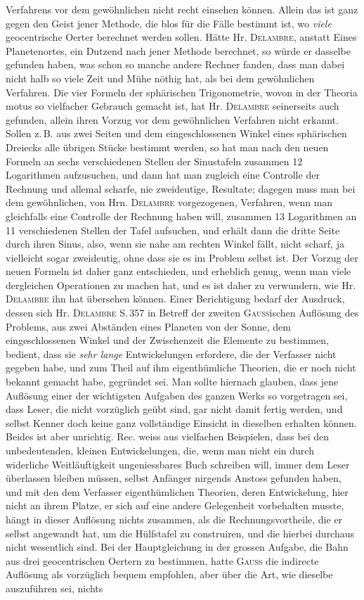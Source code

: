 \noindent Verfahrens vor dem gewöhnlichen nicht recht einsehen können. Allein das ist ganz gegen den Geist jener Methode, die blos für die Fälle bestimmt ist, wo \emph{viele} geocentrische Oerter berechnet werden sollen. Hätte Hr. \textsc{Delambre}, anstatt Eines Planetenortes, ein Dutzend nach jener Methode berechnet, so würde er dasselbe gefunden haben, was schon so manche andere Rechner fanden, dass man dabei nicht halb so viele Zeit und Mühe nöthig hat, als bei dem gewöhnlichen Verfahren. Die vier Formeln der sphärischen Trigonometrie, wovon in der Theoria motus so vielfacher Gebrauch gemacht ist, hat Hr. \textsc{Delambre} seinerseits auch gefunden, allein ihren Vorzug vor dem gewöhnlichen Verfahren nicht erkannt. Sollen z.\,B. aus zwei Seiten und dem eingeschlossenen Winkel eines sphärischen Dreiecks alle übrigen Stücke bestimmt werden, so hat man nach den neuen Formeln an sechs verschiedenen Stellen der Sinustafeln zusammen 12 Logarithmen aufzusuchen, und dann hat man zugleich eine Controlle der Rechnung und allemal scharfe, nie zweideutige, Resultate; dagegen muss man bei dem gewöhnlichen, von Hrn. \textsc{Delambre} vorgezogenen, Verfahren, wenn man gleichfalls eine Controlle der Rechnung haben will, zusammen 13 Logarithmen an 11 verschiedenen Stellen der Tafel aufsuchen, und erhält dann die dritte Seite durch ihren Sinus, also, wenn sie nahe am rechten Winkel fällt, nicht scharf, ja vielleicht sogar zweideutig, ohne dass sie es im Problem selbst ist. Der Vorzug der neuen Formeln ist daher ganz entschieden, und erheblich genug, wenn man viele dergleichen Operationen zu machen hat, und es ist daher zu verwundern, wie Hr. \textsc{Delambre} ihn hat übersehen können. Einer Berichtigung bedarf der Ausdruck, dessen sich Hr. \textsc{Delambre} S.\,357 in Betreff der zweiten \textsc{Gauss}ischen Auflösung des Problems, aus zwei Abständen eines Planeten von der Sonne, dem eingeschlossenen Winkel und der Zwischenzeit die Elemente zu bestimmen, bedient, dass sie \emph{sehr lange} Entwickelungen erfordere, die der Verfasser nicht gegeben habe, und zum Theil auf ihm eigenthümliche Theorien, die er noch nicht bekannt gemacht habe, gegründet sei. Man sollte hiernach glauben, dass jene Auflösung einer der wichtigsten Aufgaben des ganzen Werks so vorgetragen sei, dass Leser, die nicht vorzüglich geübt sind, gar nicht damit fertig werden, und selbst Kenner doch keine ganz vollständige Einsicht in dieselben erhalten können. Beides ist aber unrichtig. Rec. weiss aus vielfachen Beispielen, dass bei den unbedeutenden, kleinen Entwickelungen, die, wenn man nicht ein durch widerliche Weitläuftigkeit ungeniessbares Buch schreiben will, immer dem Leser überlassen bleiben müssen, selbst Anfänger nirgends Anstoss gefunden haben, und mit den dem Verfasser eigenthümlichen Theorien, deren Entwickelung, hier nicht an ihrem Platze, er sich auf eine andere Gelegenheit vorbehalten musste, hängt in dieser Auflösung nichts zusammen, als die Rechnungsvortheile, die er selbst angewandt hat, um die Hülfstafel zu construiren, und die hierbei durchaus nicht wesentlich sind. Bei der Hauptgleichung in der grossen Aufgabe, die Bahn aus drei geocentrischen Oertern zu bestimmen, hatte \textsc{Gauss} die indirecte Auflösung als vorzüglich bequem empfohlen, aber über die Art, wie dieselbe auszuführen sei, nichts 